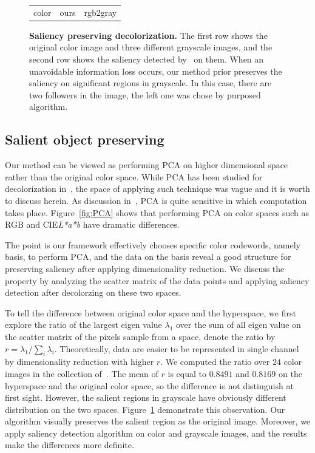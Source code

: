 \begin{figure}[t]
\begin{center}
\begin{tabular}{ccc}
color & ours & rgb2gray \\
\end{tabular}
\caption{
\textbf{Saliency preserving decolorization.}
The first row shows the original color image and three different grayscale images,
and the second row shows the saliency detected by~\protect\cite{Hou:2012:ISH} 
on them. When an unavoidable information loss occurs,
our method prior preserves the saliency on significant regions in grayscale.
In this case, there are two followers in the image, the left one was chose by
purposed algorithm.
}\label{fig:saliency}
\end{center}
\end{figure}

\subsection{Salient object preserving}
\label{sec:saliency}
Our method can be viewed as performing PCA on higher dimensional space
rather than the original color space.
While PCA has been studied for decolorization in~\cite{Gooch:2005:CSC}, the space
of applying such technique was vague and it is worth to discuss herein.
As discussion in~\cite{Gooch:2005:CSC}, PCA is quite sensitive in which computation
takes place. Figure~\ref{fig:PCA} shows that performing PCA on color spaces such as
RGB and CIE{\it L*a*b} have dramatic differences.

The point is our framework effectively chooses specific color codewords, namely basis,
to perform PCA, and the data on the basis reveal a good structure for preserving saliency
after applying dimensionality reduction.
We discuss the property by analyzing the scatter matrix of the data points
and applying saliency detection after decolorzing on these two spaces.

To tell the difference between original color space and the hyperspace,
we first explore the ratio of the largest eigen value $\lambda_1$ over 
the sum of all eigen value on the scatter matrix of the pixels sample from a space, 
denote the ratio by 
$r = \lambda_1 / \sum_i \lambda_i$.
Theoretically, data are easier to be represented in single channel 
by dimensionality reduction with higher $r$. 
We computed the ratio over $24$ color images in the collection of~\cite{Ancuti:2011:ESG}.
The mean of $r$ is equal to $0.8491$ and $0.8169$ on the hyperspace and the original color
space, so the difference is not distinguish at first sight.
However, the salient regions in grayscale 
have obviously different distribution on the two spaces.
Figure~\ref{fig:saliency} demonstrate this observation.
Our algorithm visually preserves the salient region as the original image.
Moreover, we apply saliency detection algorithm on color and grayscale images, and
the results make the differences more definite.

